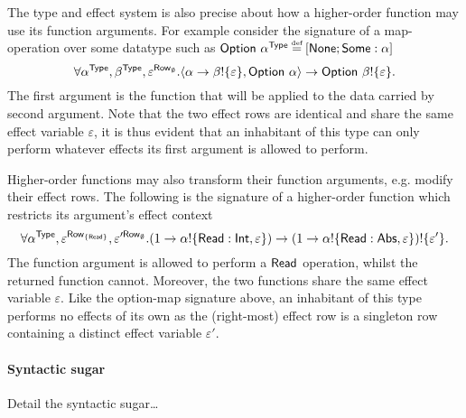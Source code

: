 \documentclass[12pt,phd,lfcs,twoside,openright,logo,leftchapter,normalheadings]{infthesis}
\theoremstyle{plain}
\theoremstyle{definition}
\begin{document}
The type and effect system is also precise about how a higher-order
function may use its function arguments. For example consider the
signature of a map-operation over some datatype such as
$\dec{Option}~\alpha^\Type \defas [\dec{None};\dec{Some}:\alpha]$
%
\[
  \forall \alpha^{\mathsf{Type}},\beta^{\mathsf{Type}},\varepsilon^{\mathsf{Row}_\emptyset}. \langle \alpha \to \beta ! \{\varepsilon\}, \mathsf{Option}~\alpha \rangle \to \mathsf{Option}~\beta ! \{\varepsilon\}.
\]
%
%
The first argument is the function that will be applied to the data
carried by second argument. Note that the two effect rows are
identical and share the same effect variable $\varepsilon$, it is thus
evident that an inhabitant of this type can only perform whatever
effects its first argument is allowed to perform.

Higher-order functions may also transform their function arguments,
e.g. modify their effect rows. The following is the signature of a
higher-order function which restricts its argument's effect context
%
\[
  \forall \alpha^{\mathsf{Type}}, \varepsilon^{\mathsf{Row}_{\{\mathsf{Read}\}}},\varepsilon'^{\mathsf{Row}_\emptyset}. (1 \to \alpha ! \{\mathsf{Read}:\mathsf{Int},\varepsilon\}) \to (1 \to \alpha ! \{\mathsf{Read}:\mathsf{Abs},\varepsilon\}) ! \{\varepsilon'\}.
\]
%
The function argument is allowed to perform a $\mathsf{Read}$ operation,
whilst the returned function cannot. Moreover, the two functions share
the same effect variable $\varepsilon$. Like the option-map signature
above, an inhabitant of this type performs no effects of its own as
the (right-most) effect row is a singleton row containing a distinct
effect variable $\varepsilon'$.

\paragraph{Syntactic sugar}
Detail the syntactic sugar\dots
\end{document}
